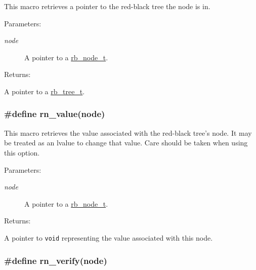 This macro retrieves a pointer to the red-black tree the node is in.\begin{Desc}
\item[Parameters: ]\par
\begin{description}
\item[{\em 
node}]A pointer to a \hyperlink{group__dbprim__rbtree_a1}{rb\_\-node\_\-t}.\end{description}
\end{Desc}
\begin{Desc}
\item[Returns: ]\par
A pointer to a \hyperlink{group__dbprim__rbtree_a0}{rb\_\-tree\_\-t}. \end{Desc}
\hypertarget{group__dbprim__rbtree_a33}{
\subsubsection[rn\_\-value]{\setlength{\rightskip}{0pt plus 5cm}\#define rn\_\-value(node)}}
\label{group__dbprim__rbtree_a33}


This macro retrieves the value associated with the red-black tree's node. It may be treated as an lvalue to change that value. Care should be taken when using this option.\begin{Desc}
\item[Parameters: ]\par
\begin{description}
\item[{\em 
node}]A pointer to a \hyperlink{group__dbprim__rbtree_a1}{rb\_\-node\_\-t}.\end{description}
\end{Desc}
\begin{Desc}
\item[Returns: ]\par
A pointer to {\tt void} representing the value associated with this node. \end{Desc}
\hypertarget{group__dbprim__rbtree_a26}{
\subsubsection[rn\_\-verify]{\setlength{\rightskip}{0pt plus 5cm}\#define rn\_\-verify(node)}}
\label{group__dbprim__rbtree_a26}


